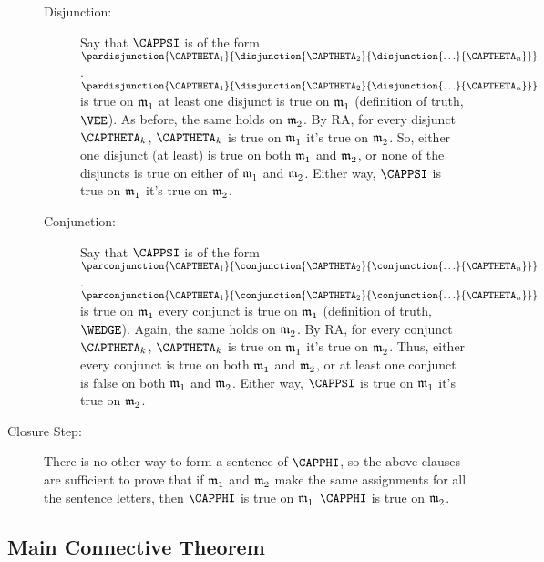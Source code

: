 \begin{PROOF}
\begin{description}
\begin{description}
			\item[Disjunction:] Say that $\CAPPSI$ is of the form $\pardisjunction{\CAPTHETA_1}{\disjunction{\CAPTHETA_2}{\disjunction{\ldots}{\CAPTHETA_{\integer{n}}}}}$.  $\pardisjunction{\CAPTHETA_1}{\disjunction{\CAPTHETA_2}{\disjunction{\ldots}{\CAPTHETA_{\integer{n}}}}}$ is true on $\mathfrak{m^{\mathrm{}}_{\mathrm{1}}}$ \Iff at least one disjunct is true on $\mathfrak{m^{\mathrm{}}_{\mathrm{1}}}$ (definition of truth, $\VEE$).  As before, the same holds on $\mathfrak{m^{\mathrm{}}_{\mathrm{2}}}$.  By RA, for every disjunct $\CAPTHETA_{k}$, $\CAPTHETA_{k}$ is true on $\mathfrak{m^{\mathrm{}}_{\mathrm{1}}}$ \Iff it's true on $\mathfrak{m^{\mathrm{}}_{\mathrm{2}}}$.  So, either one disjunct (at least) is true on both $\mathfrak{m^{\mathrm{}}_{\mathrm{1}}}$ and $\mathfrak{m^{\mathrm{}}_{\mathrm{2}}}$, or none of the disjuncts is true on either of $\mathfrak{m^{\mathrm{}}_{\mathrm{1}}}$ and $\mathfrak{m^{\mathrm{}}_{\mathrm{2}}}$.  Either way, $\CAPPSI$ is true on $\mathfrak{m^{\mathrm{}}_{\mathrm{1}}}$ \Iff it's true on $\mathfrak{m^{\mathrm{}}_{\mathrm{2}}}$.
			\item[Conjunction:] Say that $\CAPPSI$ is of the form $\parconjunction{\CAPTHETA_1}{\conjunction{\CAPTHETA_2}{\conjunction{\ldots}{\CAPTHETA_{\integer{n}}}}}$.  $\parconjunction{\CAPTHETA_1}{\conjunction{\CAPTHETA_2}{\conjunction{\ldots}{\CAPTHETA_{\integer{n}}}}}$ is true on $\mathfrak{m^{\mathrm{}}_{\mathrm{1}}}$ \Iff every conjunct is true on $\mathfrak{m^{\mathrm{}}_{\mathrm{1}}}$ (definition of truth, $\WEDGE$).  Again, the same holds on $\mathfrak{m^{\mathrm{}}_{\mathrm{2}}}$.  By RA, for every conjunct $\CAPTHETA_{k}$, $\CAPTHETA_{k}$ is true on $\mathfrak{m^{\mathrm{}}_{\mathrm{1}}}$ \Iff it's true on $\mathfrak{m^{\mathrm{}}_{\mathrm{2}}}$.  Thus, either every conjunct is true on both $\mathfrak{m^{\mathrm{}}_{\mathrm{1}}}$ and $\mathfrak{m^{\mathrm{}}_{\mathrm{2}}}$, or at least one conjunct is false on both $\mathfrak{m^{\mathrm{}}_{\mathrm{1}}}$ and $\mathfrak{m^{\mathrm{}}_{\mathrm{2}}}$.  Either way, $\CAPPSI$ is true on $\mathfrak{m^{\mathrm{}}_{\mathrm{1}}}$ \Iff it's true on $\mathfrak{m^{\mathrm{}}_{\mathrm{2}}}$.
		\end{description}
		\item[Closure Step:] There is no other way to form a sentence of \GSL{} $\CAPPHI$, so the above clauses are sufficient to prove that if $\mathfrak{m^{\mathrm{}}_{\mathrm{1}}}$ and $\mathfrak{m^{\mathrm{}}_{\mathrm{2}}}$ make the same assignments for all the sentence letters, then $\CAPPHI$ is true on $\mathfrak{m^{\mathrm{}}_{\mathrm{1}}}$ \Iff $\CAPPHI$ is true on $\mathfrak{m^{\mathrm{}}_{\mathrm{2}}}$.
	\end{description}
\end{PROOF}


\subsection{Main Connective Theorem}\label{additional recur examples} 

